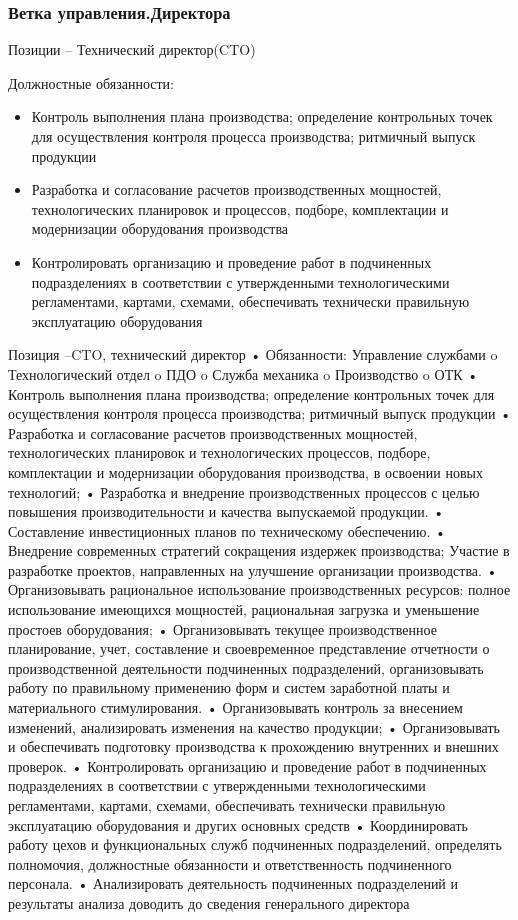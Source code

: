 \documentclass{../industrial-development}
\begin{document}
\begin{frame} \frametitle{Ветка управления.Директора}
 \begin{block}{}
  \alert{Позиции – Технический директор(CTO)}

Должностные обязанности: 
  \end{block}
  \begin{itemize}
  \item Контроль выполнения плана производства; определение контрольных точек для осуществления контроля процесса производства; ритмичный выпуск продукции
 \item Разработка и согласование расчетов производственных мощностей, технологических планировок и  процессов, подборе, комплектации и модернизации оборудования производства
 \item Контролировать организацию и проведение работ в подчиненных подразделениях в соответствии с утвержденными технологическими регламентами, картами, схемами, обеспечивать технически правильную эксплуатацию оборудования 
  \end{itemize}
\end{frame}

\lecturenotes
Позиция –CTO, технический директор
•	Обязанности:
Управление службами
o	Технологический отдел
o	ПДО
o	Служба механика
o	Производство
o	ОТК
•	Контроль выполнения плана производства; определение контрольных точек для осуществления контроля процесса производства; ритмичный выпуск продукции
•	Разработка и согласование расчетов производственных мощностей, технологических планировок и технологических процессов, подборе, комплектации и модернизации оборудования производства, в освоении новых технологий;
•	Разработка и внедрение производственных процессов с целью повышения производительности и качества выпускаемой продукции.
•	Составление инвестиционных планов по техническому обеспечению.
•	Внедрение современных стратегий сокращения издержек производства; Участие в разработке проектов, направленных на улучшение организации производства.
•	Организовывать рациональное использование производственных ресурсов: полное использование имеющихся мощностей, рациональная загрузка и уменьшение простоев оборудования;
•	Организовывать текущее производственное планирование, учет, составление и своевременное представление отчетности о производственной деятельности подчиненных подразделений, организовывать работу по правильному применению форм и систем заработной платы и материального стимулирования.
•	Организовывать контроль за внесением изменений, анализировать изменения на качество продукции;
•	Организовывать и обеспечивать подготовку производства к прохождению внутренних и внешних проверок.
•	Контролировать организацию и проведение работ в подчиненных подразделениях в соответствии с утвержденными технологическими регламентами, картами, схемами, обеспечивать технически правильную эксплуатацию оборудования и других основных средств
•	Координировать работу цехов и функциональных служб подчиненных подразделений, определять полномочия, должностные обязанности и ответственность подчиненного персонала.
•	Анализировать деятельность подчиненных подразделений и результаты анализа доводить до сведения генерального директора
\end{document}
